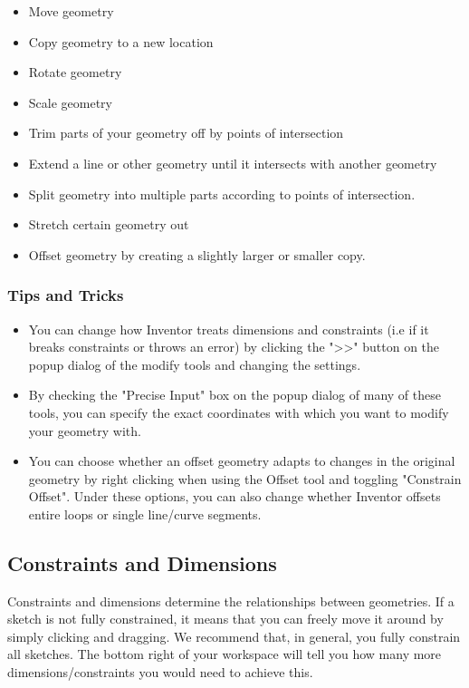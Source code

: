 \begin{itemize}
\item Move geometry
\item Copy geometry to a new location
\item Rotate geometry
\item Scale geometry
\item Trim parts of your geometry off by points of intersection
\item Extend a line or other geometry until it intersects with another geometry
\item Split geometry into multiple parts according to points of intersection.
\item Stretch certain geometry out
\item Offset geometry by creating a slightly larger or smaller copy.
\end{itemize}

\subsubsection{Tips and Tricks}
\begin{itemize}
\item You can change how Inventor treats dimensions and constraints (i.e if it breaks constraints or throws an error) by clicking the ">>" button on the popup dialog of the modify tools and changing the settings.
\item By checking the "Precise Input" box on the popup dialog of many of these tools, you can specify the exact coordinates with which you want to modify your geometry with.
\item You can choose whether an offset geometry adapts to changes in the original geometry by right clicking when using the Offset tool and toggling "Constrain Offset". Under these options, you can also change whether Inventor offsets entire loops or single line/curve segments.
\end{itemize}

\subsection{Constraints and Dimensions}
Constraints and dimensions determine the relationships between geometries. If a sketch is not fully constrained, it means that you can freely move it around by simply clicking and dragging. We recommend that, in general, you fully constrain all sketches. The bottom right of your workspace will tell you how many more dimensions/constraints you would need to achieve this.

